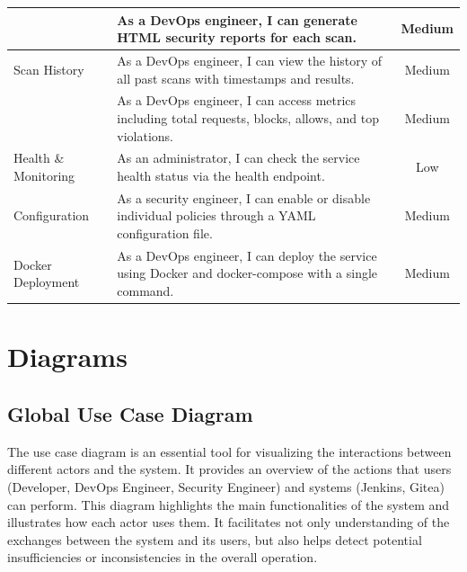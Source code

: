 \begin{longtable}{|p{3.5cm}|p{7cm}|c|}
& As a DevOps engineer, I can generate HTML security reports for each scan.
& Medium \\
\hline

Scan History
& As a DevOps engineer, I can view the history of all past scans with timestamps and results.
& Medium \\
\hline

& As a DevOps engineer, I can access metrics including total requests, blocks, allows, and top violations.
& Medium \\
\hline

Health \& Monitoring
& As an administrator, I can check the service health status via the health endpoint.
& Low \\
\hline

Configuration
& As a security engineer, I can enable or disable individual policies through a YAML configuration file.
& Medium \\
\hline

Docker Deployment
& As a DevOps engineer, I can deploy the service using Docker and docker-compose with a single command.
& Medium \\
\hline

\end{longtable}

\section{Diagrams}

\subsection{Global Use Case Diagram}

The use case diagram is an essential tool for visualizing the interactions between different actors and the system. It provides an overview of the actions that users (Developer, DevOps Engineer, Security Engineer) and systems (Jenkins, Gitea) can perform. This diagram highlights the main functionalities of the system and illustrates how each actor uses them. It facilitates not only understanding of the exchanges between the system and its users, but also helps detect potential insufficiencies or inconsistencies in the overall operation.

%

